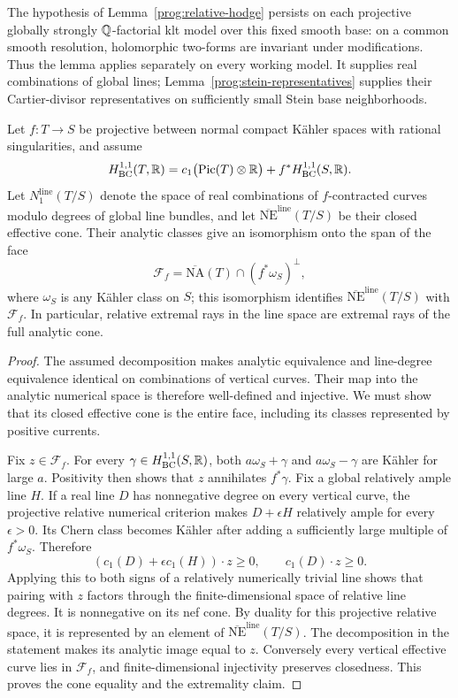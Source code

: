 The hypothesis of Lemma~\ref{prog:relative-hodge} persists on each
projective globally strongly \(\mathbb Q\)-factorial klt model over this fixed
smooth base: on a common smooth resolution, holomorphic two-forms are
invariant under modifications. Thus the lemma applies separately on
every working model. It supplies real combinations of global lines;
Lemma~\ref{prog:stein-representatives} supplies their Cartier-divisor
representatives on sufficiently small Stein base neighborhoods.

\begin{lemma}
\label{prog:projective-cone}
Let \(f:T\to S\) be projective between normal compact Kähler spaces
with rational singularities, and assume
\[
 H^{1,1}_{\mathrm{BC}}(T,\mathbb R)
   =c_1\bigl(\operatorname{Pic}(T)\otimes\mathbb R\bigr)
          +f^*H^{1,1}_{\mathrm{BC}}(S,\mathbb R).
\]
Let \(N_1^{\mathrm{line}}(T/S)\) denote the space of real combinations
of \(f\)-contracted curves modulo degrees of global line bundles,
and let \(\overline{\mathrm{NE}}^{\mathrm{line}}(T/S)\) be their
closed effective cone. Their analytic classes give an isomorphism
onto the span of the face
\[
 \mathcal F_f=
 \overline{\mathrm{NA}}(T)\cap(f^*\omega_S)^\perp,
\]
where \(\omega_S\) is any Kähler class on \(S\); this isomorphism
identifies \(\overline{\mathrm{NE}}^{\mathrm{line}}(T/S)\) with
\(\mathcal F_f\). In particular, relative extremal rays in the line
space are extremal rays of the full analytic cone.
\end{lemma}

\begin{proof}
The assumed decomposition makes analytic equivalence and line-degree
equivalence identical on combinations of vertical curves. Their map
into the analytic numerical space is therefore well-defined and
injective. We must show that its closed effective cone is the entire
face, including its classes represented by positive currents.

Fix \(z\in\mathcal F_f\). For every \(\gamma\in
H^{1,1}_{\mathrm{BC}}(S,\mathbb R)\), both \(a\omega_S+\gamma\) and
\(a\omega_S-\gamma\) are Kähler for large \(a\). Positivity then
shows that \(z\) annihilates \(f^*\gamma\). Fix a global relatively
ample line \(H\). If a real line \(D\) has nonnegative degree on
every vertical curve, the projective relative numerical criterion
makes \(D+\epsilon H\) relatively ample for every \(\epsilon>0\).
Its Chern class becomes Kähler after adding a sufficiently large
multiple of \(f^*\omega_S\). Therefore
\[
                 (c_1(D)+\epsilon c_1(H))\cdot z\geq0,
 \qquad c_1(D)\cdot z\geq0.
\]
Applying this to both signs of a relatively numerically trivial line
shows that pairing with \(z\) factors through the finite-dimensional
space of relative line degrees. It is nonnegative on its nef cone.
By duality for this projective relative space, it is represented by
an element of \(\overline{\mathrm{NE}}^{\mathrm{line}}(T/S)\).
The decomposition in the statement makes its analytic image equal
to \(z\). Conversely every vertical effective curve lies in
\(\mathcal F_f\), and finite-dimensional injectivity preserves
closedness. This proves the cone equality and the extremality claim.
\end{proof}
